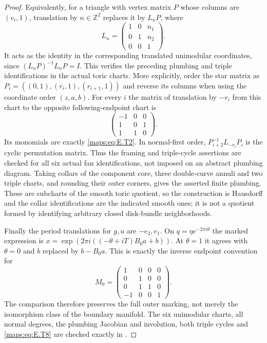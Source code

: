 \begin{proof}
Equivalently, for a triangle with vertex matrix $P$ whose
columns are $(v_i,1)$, translation by $n\in\mathbb Z^2$
replaces it by $L_nP$, where
\[
 L_n=\begin{pmatrix}1&0&n_1\\0&1&n_2\\0&0&1\end{pmatrix}.
 \tag{E.T7}\label{maps:eq:E.T7}
\]
It acts as the identity in the corresponding translated
unimodular coordinates, since
$(L_nP)^{-1}L_nP=I$.  This verifies the preceding plumbing
and triple identifications in the actual toric charts.
More explicitly, order the star matrix as
$P_i=((0,1),(r_i,1),(r_{i+1},1))$ and reverse its
columns when using the coordinate order $(z,a,b)$.
For every $i$ the matrix of translation by $-r_i$ from
this chart to the opposite following-endpoint chart is
\[
 \begin{pmatrix}-1&0&0\\1&0&1\\1&1&0\end{pmatrix}.
 \tag{E.T9}\label{maps:eq:E.T9}
\]
Its monomials are exactly \eqref{maps:eq:E.T2}.  In normal-first order,
$P_{i+2}^{-1}L_{-r_i}P_i$ is the cyclic permutation
matrix.  Thus the framing and triple-cycle assertions
are checked for all six actual fan identifications,
not imposed on an abstract plumbing diagram.
Taking collars of the component core, three double-curve
annuli and two triple charts, and rounding their outer
corners, gives the asserted finite plumbing.  These are
subcharts of the smooth toric quotient, so the construction
is Hausdorff and the collar identifications are the indicated
smooth ones; it is not a quotient formed by identifying
arbitrary closed disk-bundle neighborhoods.

Finally the period translations for $g,u$ are $-e_2,e_1$.
On $q=\eta e^{-2\pi i\theta}$ the marked expression is
$x=\exp(2\pi i((-\theta+iT)B_0a+b))$.
At $\theta=1$ it agrees with $\theta=0$ and
$b$ replaced by $b-B_0a$.  This is exactly the inverse
endpoint convention for
\[
 M_0=\begin{pmatrix}
 1&0&0&0\\0&1&0&0\\0&1&1&0\\-1&0&0&1
 \end{pmatrix}.
 \tag{E.T8}\label{maps:eq:E.T8}
\]
The comparison therefore preserves the full outer marking,
not merely the isomorphism class of the boundary manifold.
The six unimodular charts, all normal degrees, the plumbing
Jacobian and involution, both triple cycles and \eqref{maps:eq:E.T8} are
checked exactly in .
\end{proof}



